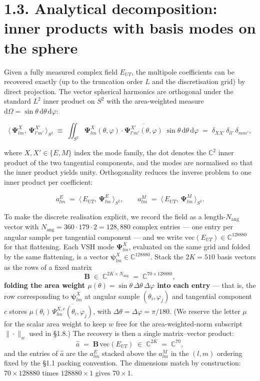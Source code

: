\documentclass[
  english,
  11pt,
]{report}
\begin{document}
\section{1.3. Analytical decomposition: inner products with basis modes
on the
sphere}\label{analytical-decomposition-inner-products-with-basis-modes-on-the-sphere}

Given a fully measured complex field \(E_{UT}\), the multipole
coefficients can be recovered exactly (up to the truncation order \(L\)
and the discretisation grid) by direct projection. The vector spherical
harmonics are orthogonal under the standard \(L^2\) inner product on
\(S^2\) with the area-weighted measure
\(\mathrm{d}\Omega = \sin\theta\,\mathrm{d}\theta\,\mathrm{d}\varphi\):

\[
\langle\,\boldsymbol{\Psi}^X_{lm},\, \boldsymbol{\Psi}^{X'}_{l'm'}\,\rangle_{S^2}
\;\equiv\;\iint_{S^2} \boldsymbol{\Psi}^X_{lm}(\theta,\varphi) \cdot \overline{\boldsymbol{\Psi}^{X'}_{l'm'}(\theta,\varphi)}\;\sin\theta\,\mathrm{d}\theta\,\mathrm{d}\varphi
\;=\;\delta_{XX'}\,\delta_{ll'}\,\delta_{mm'},
\]

where \(X, X' \in \{E, M\}\) index the mode family, the dot denotes the
\(\mathbb{C}^2\) inner product of the two tangential components, and the
modes are normalised so that the inner product yields unity.
Orthogonality reduces the inverse problem to one inner product per
coefficient:

\[
a^E_{lm} \;=\; \langle\,E_{UT},\, \boldsymbol{\Psi}^E_{lm}\,\rangle_{S^2}, \qquad
a^M_{lm} \;=\; \langle\,E_{UT},\, \boldsymbol{\Psi}^M_{lm}\,\rangle_{S^2}.
\]

To make the discrete realisation explicit, we record the field as a
length-\(N_{\mathrm{ang}}\) vector with
\(N_{\mathrm{ang}} = 360\cdot 179\cdot 2 = 128{,}880\) complex entries
--- one entry per angular sample per tangential component --- and we
write \(\mathrm{vec}(E_{UT})\in\mathbb{C}^{128880}\) for that
flattening. Each VSH mode \(\boldsymbol{\Psi}^X_{lm}\), evaluated on the
same grid and folded by the same flattening, is a vector
\(\boldsymbol\psi^X_{lm}\in\mathbb{C}^{128880}\). Stack the \(2K = 510\)
basis vectors as the rows of a fixed matrix \[
\mathbf{B} \;\in\; \mathbb{C}^{2K \times N_{\mathrm{ang}}} \;=\; \mathbb{C}^{70 \times 128880},
\] \textbf{folding the area weight
\(\mu(\theta) = \sin\theta\,\Delta\theta\,\Delta\varphi\) into each
entry} --- that is, the row corresponding to \(\boldsymbol\psi^X_{lm}\)
at angular sample \((\theta_i, \varphi_j)\) and tangential component
\(c\) stores
\(\mu(\theta_i)\,\overline{\Psi^{X,c}_{lm}(\theta_i,\varphi_j)}\), with
\(\Delta\theta = \Delta\varphi = \pi/180\). (We reserve the letter
\(\mu\) for the scalar area weight to keep \(w\) free for the
area-weighted-norm subscript \(\|\cdot\|_w\) used in §1.8.) The recovery
is then a single matrix--vector product: \[
\hat{a} \;=\; \mathbf{B}\,\mathrm{vec}(E_{UT}) \;\in\; \mathbb{C}^{2K} \;=\; \mathbb{C}^{70},
\] and the entries of \(\hat a\) are the \(a^E_{lm}\) stacked above the
\(a^M_{lm}\) in the \((l,m)\) ordering fixed by the §1.1 packing
convention. The dimensions match by construction: \(70 \times 128880\)
times \(128880 \times 1\) gives \(70 \times 1\).
\end{document}
